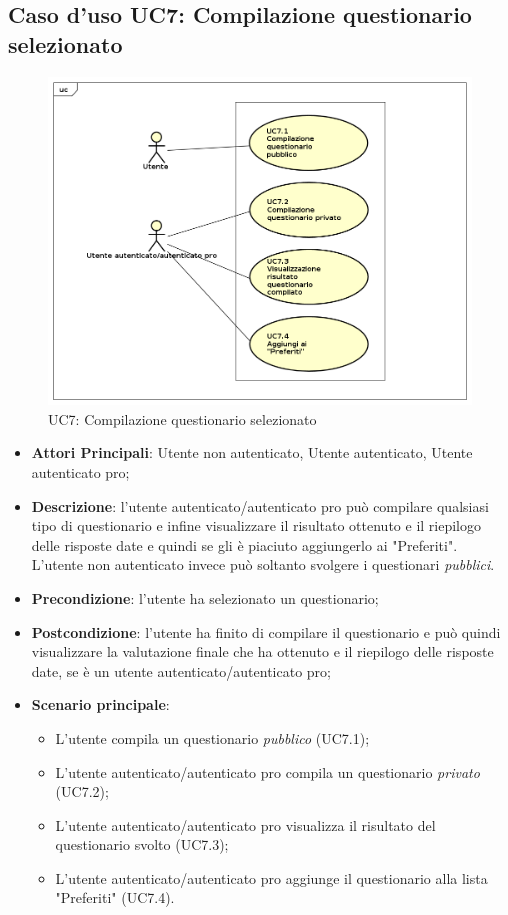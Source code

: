 \subsection{Caso d'uso UC7: Compilazione questionario selezionato}
\label{UC7}
\begin{figure}[h]
\centering
\includegraphics[scale=0.5,keepaspectratio]{UML/UC7.png}
\caption{UC7: Compilazione questionario selezionato}
\end{figure}
\FloatBarrier
\begin{itemize}
\item\textbf{Attori Principali}: Utente non autenticato, Utente autenticato, Utente autenticato pro;
\item\textbf{Descrizione}: l'utente autenticato/autenticato pro può compilare qualsiasi tipo di questionario e infine visualizzare il risultato ottenuto e il riepilogo delle risposte date e quindi se gli è piaciuto aggiungerlo ai "Preferiti". L'utente non autenticato invece può soltanto svolgere i questionari \textit{pubblici}.
\item\textbf{Precondizione}: l'utente ha selezionato un questionario;
\item\textbf{Postcondizione}: l'utente ha finito di compilare il questionario e può quindi visualizzare la valutazione finale che ha ottenuto e il riepilogo delle risposte date, se è un utente autenticato/autenticato pro;
\item\textbf{Scenario principale}:
\begin{itemize}
\item L'utente compila un questionario \textit{pubblico} (UC7.1);
\item L'utente autenticato/autenticato pro compila un questionario \textit{privato} (UC7.2);
\item L'utente autenticato/autenticato pro visualizza il risultato del questionario svolto (UC7.3);
\item L'utente autenticato/autenticato pro aggiunge il questionario alla lista "Preferiti" (UC7.4).
\end{itemize}
\end{itemize}

